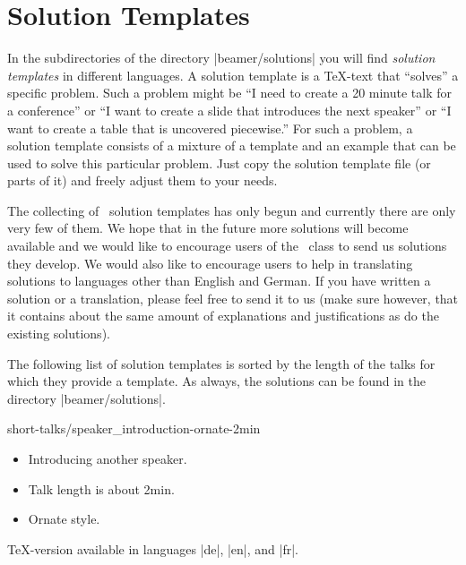 %
%
%


\section{Solution Templates}
\label{section-solutions}

In the subdirectories of the directory |beamer/solutions| you will find \emph{solution templates} in different languages. A solution template is a \TeX-text that ``solves'' a specific problem. Such a problem might be ``I need to create a 20 minute talk for a conference'' or ``I want to create a slide that introduces the next speaker'' or ``I want to create a table that is uncovered piecewise.'' For such a problem, a solution template consists of a mixture of a template and an example that can be used to solve this particular problem. Just copy the solution template file (or parts of it) and freely adjust them to your needs.

The collecting of \beamer\ solution templates has only begun and currently there are only very few of them. We hope that in the future more solutions will become available and we would like to encourage users of the \beamer\ class to send us solutions they develop. We would also like to encourage users to help in translating solutions to languages other than English and German. If you have written a solution or a translation, please feel free to send it to us (make sure however, that it contains about the same amount of explanations and justifications as do the existing solutions).

The following list of solution templates is sorted by the length of the talks for which they provide a template. As always, the solutions can be found in the directory |beamer/solutions|.

\begin{solution}{short-talks/speaker\_introduction-ornate-2min}
  \begin{itemize}
  \item
    Introducing another speaker.
  \item
    Talk length is about 2min.
  \item
    Ornate style.
  \end{itemize}

  \beamernote
  \TeX-version available in languages |de|, |en|, and |fr|.

\end{solution}

